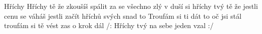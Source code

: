 \begin{TEXT}{Hříchy}
\REFREN  Hříchy  tě  že \NL
zkoušíš spálit  za se \NL
všechno zlý v duší  si   \NL
hříchy tvý tě  že 
\SLOKA {} jestli  cenu se  \NL
váháš jestli  začít  \NL
hříchů svých snad  to 
\SLOKA Troufám si ti dát to oč jsi stál \NL
troufám si tě vést zas o krok dál \NL
/: Hříchy tvý na sebe jeden vzal :/ \NL
\end{TEXT}
